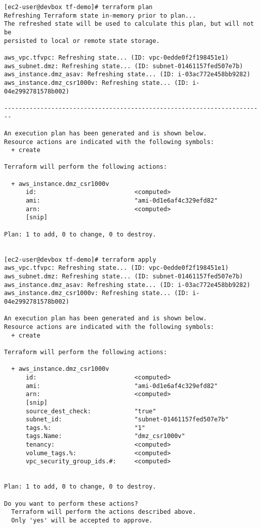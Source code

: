 \begin{verbatim}
[ec2-user@devbox tf-demo]# terraform plan
Refreshing Terraform state in-memory prior to plan...
The refreshed state will be used to calculate this plan, but will not be
persisted to local or remote state storage.

aws_vpc.tfvpc: Refreshing state... (ID: vpc-0edde0f2f198451e1)
aws_subnet.dmz: Refreshing state... (ID: subnet-01461157fed507e7b)
aws_instance.dmz_asav: Refreshing state... (ID: i-03ac772e458bb9282)
aws_instance.dmz_csr1000v: Refreshing state... (ID: i-04e2992781578b002)

------------------------------------------------------------------------

An execution plan has been generated and is shown below.
Resource actions are indicated with the following symbols:
  + create

Terraform will perform the following actions:

  + aws_instance.dmz_csr1000v
      id:                           <computed>
      ami:                          "ami-0d1e6af4c329efd82"
      arn:                          <computed>
      [snip]

Plan: 1 to add, 0 to change, 0 to destroy.


[ec2-user@devbox tf-demo]# terraform apply
aws_vpc.tfvpc: Refreshing state... (ID: vpc-0edde0f2f198451e1)
aws_subnet.dmz: Refreshing state... (ID: subnet-01461157fed507e7b)
aws_instance.dmz_asav: Refreshing state... (ID: i-03ac772e458bb9282)
aws_instance.dmz_csr1000v: Refreshing state... (ID: i-04e2992781578b002)

An execution plan has been generated and is shown below.
Resource actions are indicated with the following symbols:
  + create

Terraform will perform the following actions:

  + aws_instance.dmz_csr1000v
      id:                           <computed>
      ami:                          "ami-0d1e6af4c329efd82"
      arn:                          <computed>
      [snip]
      source_dest_check:            "true"
      subnet_id:                    "subnet-01461157fed507e7b"
      tags.%:                       "1"
      tags.Name:                    "dmz_csr1000v"
      tenancy:                      <computed>
      volume_tags.%:                <computed>
      vpc_security_group_ids.#:     <computed>


Plan: 1 to add, 0 to change, 0 to destroy.

Do you want to perform these actions?
  Terraform will perform the actions described above.
  Only 'yes' will be accepted to approve.


\end{verbatim}
